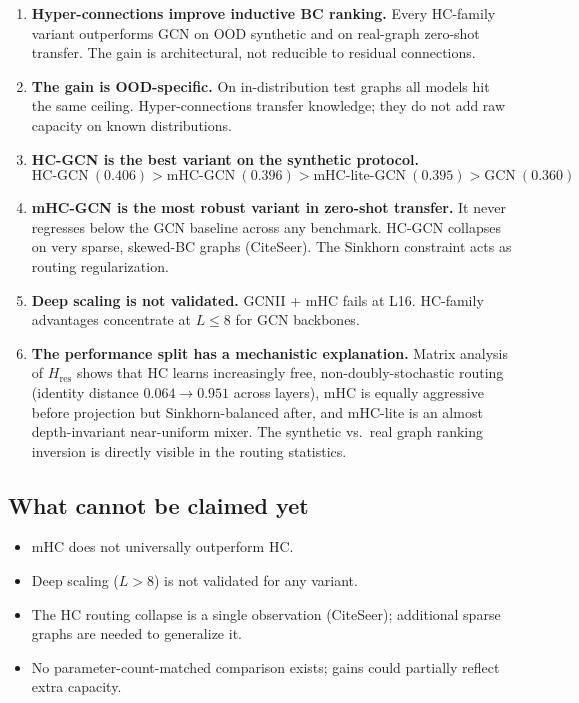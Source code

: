 \documentclass[11pt,a4paper]{article}
\begin{document}
\begin{enumerate}
  \item \textbf{Hyper-connections improve inductive BC ranking.}
        Every HC-family variant outperforms GCN on OOD synthetic
        and on real-graph zero-shot transfer.
        The gain is architectural, not reducible to residual connections.

  \item \textbf{The gain is OOD-specific.}
        On in-distribution test graphs all models hit the same ceiling.
        Hyper-connections transfer knowledge; they do not add raw capacity
        on known distributions.

  \item \textbf{HC-GCN is the best variant on the synthetic protocol.}
        \[
          \text{HC-GCN}\ (0.406) > \text{mHC-GCN}\ (0.396)
          > \text{mHC-lite-GCN}\ (0.395) > \text{GCN}\ (0.360)
        \]

  \item \textbf{mHC-GCN is the most robust variant in zero-shot transfer.}
        It never regresses below the GCN baseline across any benchmark.
        HC-GCN collapses on very sparse, skewed-BC graphs (CiteSeer).
        The Sinkhorn constraint acts as routing regularization.

  \item \textbf{Deep scaling is not validated.}
        GCNII + mHC fails at L16. HC-family advantages concentrate at
        $L \leq 8$ for GCN backbones.

  \item \textbf{The performance split has a mechanistic explanation.}
        Matrix analysis of $H_\text{res}$ shows that HC learns
        increasingly free, non-doubly-stochastic routing (identity
        distance $0.064 \to 0.951$ across layers), mHC is equally
        aggressive before projection but Sinkhorn-balanced after,
        and mHC-lite is an almost depth-invariant near-uniform mixer.
        The synthetic vs.\ real graph ranking inversion is directly
        visible in the routing statistics.
\end{enumerate}

\subsection{What cannot be claimed yet}

\begin{itemize}
  \item mHC does not universally outperform HC.
  \item Deep scaling ($L>8$) is not validated for any variant.
  \item The HC routing collapse is a single observation (CiteSeer);
        additional sparse graphs are needed to generalize it.
  \item No parameter-count-matched comparison exists;
        gains could partially reflect extra capacity.
\end{itemize}
\end{document}
